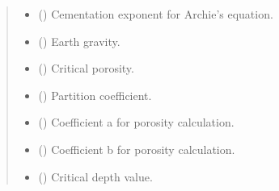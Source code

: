 \documentclass[a4paper,11pt,english,openany]{sphinxmanual}
\begin{document}
\begin{fulllineitems}
\begin{quote}
\begin{description}
\begin{itemize}
\item {} 
\sphinxAtStartPar
{} () \textendash{} Cementation exponent for Archie’s equation.

\item {} 
\sphinxAtStartPar
{} () \textendash{} Earth gravity.

\item {} 
\sphinxAtStartPar
{} () \textendash{} Critical porosity.

\item {} 
\sphinxAtStartPar
{} () \textendash{} Partition coefficient.

\item {} 
\sphinxAtStartPar
{} () \textendash{} Coefficient a for porosity calculation.

\item {} 
\sphinxAtStartPar
{} () \textendash{} Coefficient b for porosity calculation.

\item {} 
\sphinxAtStartPar
{} () \textendash{} Critical depth value.

\end{itemize}

\end{description}\end{quote}


\end{fulllineitems}
\end{document}
